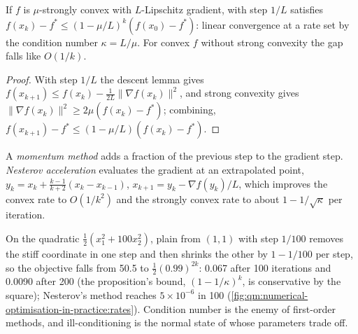 \begin{proposition}\label{prop:qm:numerical-optimisation-in-practice:rates}
If $f$ is $\mu$-strongly convex with $L$-Lipschitz gradient,  with step $1/L$ satisfies $f(x_k) - f^* \le (1 - \mu/L)^k(f(x_0) - f^*)$: linear convergence at a rate
set by the condition number $\kappa = L/\mu$. For convex $f$ without strong convexity the gap falls like $O(1/k)$.
\end{proposition}

\begin{proof}
With step $1/L$ the descent lemma gives $f(x_{k+1}) \le f(x_k) - \frac1{2L}\lVert\nabla f(x_k)\rVert^2$, and strong convexity gives $\lVert\nabla f(x_k)\rVert^2 \ge 2\mu(f(x_k) -
f^*)$; combining, $f(x_{k+1}) - f^* \le (1 - \mu/L)(f(x_k) - f^*)$.
\end{proof}

\begin{definition}\label{def:qm:numerical-optimisation-in-practice:momentum}
A \emph{momentum method} adds a fraction of the previous step to the gradient step. \emph{Nesterov acceleration} evaluates the
gradient at an extrapolated point, $y_k = x_k + \frac{k-1}{k+2}(x_k - x_{k-1})$, $x_{k+1} = y_k - \nabla f(y_k)/L$, which improves the convex rate to $O(1/k^2)$ and the strongly convex
rate to about $1 - 1/\sqrt\kappa$ per iteration.
\end{definition}

On the quadratic $\frac12(x_1^2 + 100x_2^2)$, plain  from $(1, 1)$ with step $1/100$ removes the stiff coordinate in one step and then shrinks the other by $1 - 1/100$ per
step, so the objective falls from 50.5 to $\frac12(0.99)^{2k}$: 0.067 after 100 iterations and 0.0090 after 200 (the proposition's bound, $(1 - 1/\kappa)^k$, is conservative by the square);
Nesterov's method reaches $5 \times 10^{-6}$ in 100 (\cref{fig:qm:numerical-optimisation-in-practice:rates}).
Condition number is the enemy of first-order methods, and ill-conditioning is the normal state of  whose parameters trade off.

